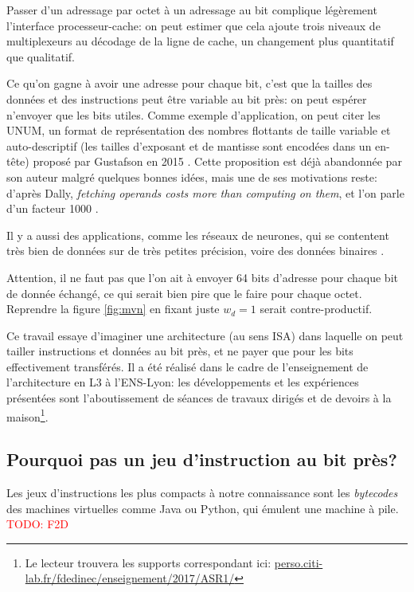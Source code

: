\documentclass[architecture]{compas2018}
\newcommand{\todo}[1]{\textcolor{red}{TODO: #1}}
\begin{document}
Passer d'un adressage par octet à un adressage au bit complique légèrement l'interface processeur-cache:
on peut estimer que cela ajoute trois niveaux de multiplexeurs au décodage de la ligne de cache, un changement plus quantitatif que qualitatif.


Ce qu'on gagne à avoir une adresse pour chaque bit, c'est que la tailles des données et des instructions peut être variable au bit près: on peut espérer n'envoyer que les bits utiles.
Comme exemple d'application, on peut citer les UNUM, un format de représentation des nombres flottants de taille variable et auto-descriptif (les tailles d'exposant et de mantisse sont encodées dans un en-tête) proposé par  Gustafson en 2015 \cite{2015-02-GUSTAFSON}.
Cette proposition est déjà abandonnée par son auteur \cite{2016-09-TICHY} malgré quelques bonnes idées, mais une de ses  motivations reste: 
d'après Dally, \emph{fetching operands costs more than computing on them}, et l'on parle d'un facteur 1000 \cite{Dally:SC2010}.


Il y a aussi des applications, comme les réseaux de neurones, qui se contentent très bien de données sur de très petites précision, voire des données binaires \cite{AndriCRB16,AlemdarEtAl2017:TernaryCNN,AmiriEtAl2018:mixedPrecCNN,Preusser:DATE2018:heteroCNN}. 

Attention, il ne faut pas que l'on ait à envoyer 64 bits d'adresse pour chaque bit de donnée échangé, ce qui serait bien pire que le faire pour chaque octet. 
Reprendre la figure \ref{fig:mvn} en fixant juste $w_d=1$ serait contre-productif.

Ce travail essaye d'imaginer une architecture (au sens ISA) dans laquelle on peut tailler instructions et données au bit près, et ne payer que pour les bits effectivement transférés.
Il a été réalisé dans le cadre de l'enseignement de l'architecture en L3 à l'ENS-Lyon: les développements et les expériences présentées sont l'aboutissement de séances de travaux dirigés et de devoirs à la maison\footnote{Le lecteur trouvera les supports correspondant ici: \url{perso.citi-lab.fr/fdedinec/enseignement/2017/ASR1/}}. 

\iffalse
\subsection{Pourquoi pas un jeu d'instruction au bit près?}

Les jeux d'instructions les plus compacts à notre connaissance sont les \emph{bytecodes} des machines virtuelles comme Java ou Python, qui émulent une machine à pile.
\todo{F2D}
\end{document}
